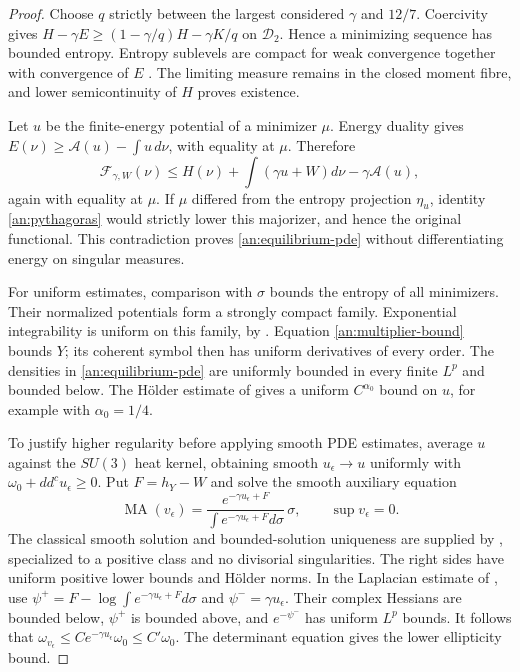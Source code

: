 \begin{proof}
Choose $q$ strictly between the largest considered $\gamma$ and $12/7$.
Coercivity gives $H-\gamma E\ge(1-\gamma/q)H-\gamma K/q$ on
$\mathcal D_2$. Hence a minimizing sequence has bounded entropy.
Entropy sublevels are compact for weak convergence together with
convergence of $E$ \citep{BBEGZ2019}. The limiting measure remains in
the closed moment fibre, and lower semicontinuity of $H$ proves existence.

Let $u$ be the finite-energy potential of a minimizer $\mu$. Energy
duality gives $E(\nu)\ge\mathcal A(u)-\int u\,d\nu$, with equality at
$\mu$. Therefore
\[
 \mathcal F_{\gamma,W}(\nu)
 \le H(\nu)+\int(\gamma u+W)d\nu-\gamma\mathcal A(u),
\]
again with equality at $\mu$. If $\mu$ differed from the entropy projection
$\eta_u$, identity \eqref{an:pythagoras} would strictly lower this
majorizer, and hence the original functional. This contradiction proves
\eqref{an:equilibrium-pde} without differentiating energy on singular
measures.

For uniform estimates, comparison with $\sigma$ bounds the entropy of
all minimizers. Their normalized potentials form a strongly compact
family. Exponential integrability is uniform on this family, by
\citet[Proposition 1.4]{BBEGZ2019}. Equation
\eqref{an:multiplier-bound} bounds $Y$; its coherent symbol then has
uniform derivatives of every order. The densities in
\eqref{an:equilibrium-pde} are uniformly bounded in every finite $L^p$
and bounded below. The H\"older estimate of
\citet[Theorem A*]{DemaillyEtAl2014} gives a uniform $C^{\alpha_0}$ bound
on $u$, for example with $\alpha_0=1/4$.

To justify higher regularity before applying smooth PDE estimates,
average $u$ against the $SU(3)$ heat kernel, obtaining smooth
$u_\epsilon\to u$ uniformly with $\omega_0+dd^cu_\epsilon\ge0$.
Put $F=h_Y-W$ and solve the smooth auxiliary equation
\[
 \operatorname{MA}(v_\epsilon)=
 \frac{e^{-\gamma u_\epsilon+F}}
 {\int e^{-\gamma u_\epsilon+F}d\sigma}\,\sigma,
 \qquad\sup v_\epsilon=0.
\]
The classical smooth solution and bounded-solution uniqueness are supplied
by \citet[Theorems A and B]{EGZ2009}, specialized to a positive class
and no divisorial singularities. The right sides have uniform positive
lower bounds and H\"older norms. In the Laplacian estimate of
\citet[Theorem B.1]{BBEGZ2019}, use
$\psi^+=F-\log\int e^{-\gamma u_\epsilon+F}d\sigma$ and
$\psi^-=\gamma u_\epsilon$. Their complex Hessians are bounded below,
$\psi^+$ is bounded above, and $e^{-\psi^-}$ has uniform $L^p$ bounds.
It follows that
$\omega_{v_\epsilon}\le C e^{-\gamma u_\epsilon}\omega_0\le C'\omega_0$.
The determinant equation gives the lower ellipticity bound.


\end{proof}

